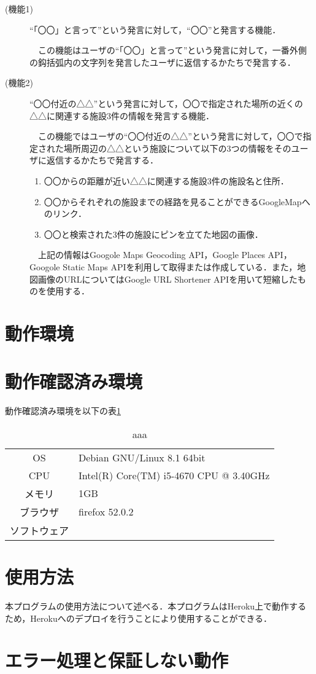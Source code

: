 \documentclass[fleqn, 14pt]{extarticlej}
\newcommand*{\tbref}[1]{表\ref{#1}}
\begin{document}
\begin{description}
\item[(機能1)]``「〇〇」と言って''という発言に対して，``〇〇''と発言する機能．
  
  　この機能はユーザの``「〇〇」と言って''という発言に対して，一番外側の鈎括弧内の文字列を発言したユーザに返信するかたちで発言する．
\item[(機能2)]``〇〇付近の△△''という発言に対して，〇〇で指定された場所の近くの△△に関連する施設3件の情報を発言する機能．
  
  　この機能ではユーザの``〇〇付近の△△''という発言に対して，〇〇で指定された場所周辺の△△という施設について以下の3つの情報をそのユーザに返信するかたちで発言する．

\begin{enumerate}
  \item 〇〇からの距離が近い△△に関連する施設3件の施設名と住所．
  \item 〇〇からそれぞれの施設までの経路を見ることができるGoogleMapへのリンク．
  \item 〇〇と検索された3件の施設にピンを立てた地図の画像． 
\end{enumerate}

　上記の情報はGoogole Maps Geocoding API，Google Places API，Googole Static Maps APIを利用して取得または作成している．また，地図画像のURLについてはGoogle URL Shortener APIを用いて短縮したものを使用する．

\end{description}

\section{動作環境}

\section{動作確認済み環境}
動作確認済み環境を以下の\tbref{tab:env}

\begin{table}[t]
  \begin{center}
    \caption{aaa}
    \label{tab:env}
    \begin{tabular}{|c|l|} \hline
      OS & Debian GNU/Linux 8.1 64bit\\ 
      CPU & Intel(R) Core(TM) i5-4670 CPU @ 3.40GHz\\ 
      メモリ & 1GB\\ 
      ブラウザ & firefox 52.0.2\\ 
      ソフトウェア & \\ \hline
    \end{tabular}
  \end{center}
\end{table}

\section{使用方法}
本プログラムの使用方法について述べる．本プログラムはHeroku上で動作するため，Herokuへのデプロイを行うことにより使用することができる．

\section{エラー処理と保証しない動作}
\end{document}
